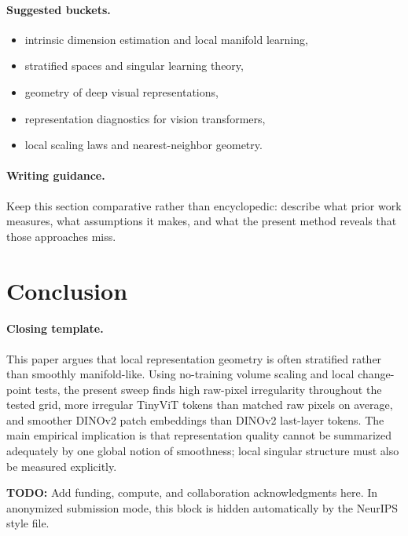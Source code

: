 \documentclass{article}
\newcommand{\TODO}[1]{\textcolor{red!70!black}{\textbf{TODO:} #1}}
\theoremstyle{definition}
\theoremstyle{plain}
\theoremstyle{remark}
\begin{document}
\paragraph{Suggested buckets.}
\begin{itemize}[leftmargin=1.5em]
\item intrinsic dimension estimation and local manifold learning,
\item stratified spaces and singular learning theory,
\item geometry of deep visual representations,
\item representation diagnostics for vision transformers,
\item local scaling laws and nearest-neighbor geometry.
\end{itemize}

\paragraph{Writing guidance.}
Keep this section comparative rather than encyclopedic: describe what prior work measures, what assumptions it makes, and what the present method reveals that those approaches miss.

\section{Conclusion}
\paragraph{Closing template.}
This paper argues that local representation geometry is often stratified rather than smoothly manifold-like. Using no-training volume scaling and local change-point tests, the present sweep finds high raw-pixel irregularity throughout the tested grid, more irregular TinyViT tokens than matched raw pixels on average, and smoother DINOv2 patch embeddings than DINOv2 last-layer tokens. The main empirical implication is that representation quality cannot be summarized adequately by one global notion of smoothness; local singular structure must also be measured explicitly.

\begin{ack}
\TODO{Add funding, compute, and collaboration acknowledgments here. In anonymized submission mode, this block is hidden automatically by the NeurIPS style file.}
\end{ack}



\end{document}
